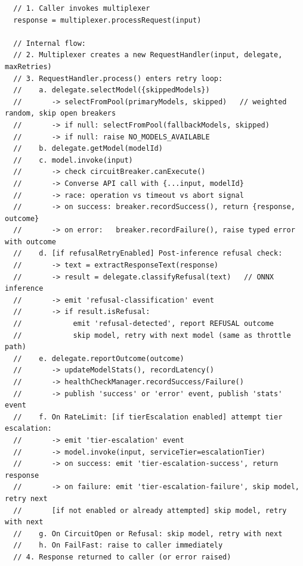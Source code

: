 \documentclass[10pt,letterpaper]{article}
\begin{document}
\begin{lstlisting}
  // 1. Caller invokes multiplexer
  response = multiplexer.processRequest(input)

  // Internal flow:
  // 2. Multiplexer creates a new RequestHandler(input, delegate, maxRetries)
  // 3. RequestHandler.process() enters retry loop:
  //    a. delegate.selectModel({skippedModels})
  //       -> selectFromPool(primaryModels, skipped)   // weighted random, skip open breakers
  //       -> if null: selectFromPool(fallbackModels, skipped)
  //       -> if null: raise NO_MODELS_AVAILABLE
  //    b. delegate.getModel(modelId)
  //    c. model.invoke(input)
  //       -> check circuitBreaker.canExecute()
  //       -> Converse API call with {...input, modelId}
  //       -> race: operation vs timeout vs abort signal
  //       -> on success: breaker.recordSuccess(), return {response, outcome}
  //       -> on error:   breaker.recordFailure(), raise typed error with outcome
  //    d. [if refusalRetryEnabled] Post-inference refusal check:
  //       -> text = extractResponseText(response)
  //       -> result = delegate.classifyRefusal(text)   // ONNX inference
  //       -> emit 'refusal-classification' event
  //       -> if result.isRefusal:
  //            emit 'refusal-detected', report REFUSAL outcome
  //            skip model, retry with next model (same as throttle path)
  //    e. delegate.reportOutcome(outcome)
  //       -> updateModelStats(), recordLatency()
  //       -> healthCheckManager.recordSuccess/Failure()
  //       -> publish 'success' or 'error' event, publish 'stats' event
  //    f. On RateLimit: [if tierEscalation enabled] attempt tier escalation:
  //       -> emit 'tier-escalation' event
  //       -> model.invoke(input, serviceTier=escalationTier)
  //       -> on success: emit 'tier-escalation-success', return response
  //       -> on failure: emit 'tier-escalation-failure', skip model, retry next
  //       [if not enabled or already attempted] skip model, retry with next
  //    g. On CircuitOpen or Refusal: skip model, retry with next
  //    h. On FailFast: raise to caller immediately
  // 4. Response returned to caller (or error raised)
\end{lstlisting}
\end{document}
